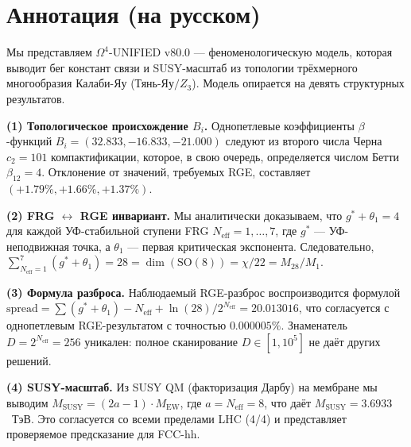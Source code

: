 \documentclass[11pt,a4paper]{article}
\theoremstyle{definition}
\begin{document}
\begin{abstract}
\medskip\noindent
\textbf{Keywords.}
Calabi--Yau, $\mathrm{SU}(26)$, $\beta$-functions, functional renormalization
group, asymptotic safety, SUSY QM, Darboux factorization,
$M_{\text{SUSY}}$, LHC, FCC-hh.
\end{abstract}

\section*{Аннотация (на русском)}

\noindent
Мы представляем $\Omega^4$-UNIFIED v80.0 --- феноменологическую модель,
которая выводит бег констант связи и SUSY-масштаб из топологии
трёхмерного многообразия Калаби-Яу (Тянь-Яу$/Z_3$).
Модель опирается на девять структурных результатов.

\medskip\noindent
\textbf{(1) Топологическое происхождение $B_i$.}
Однопетлевые коэффициенты $\beta$-функций
$B_i = (32.833, -16.833, -21.000)$ следуют из второго числа Черна
$c_2 = 101$ компактификации, которое, в свою очередь, определяется
числом Бетти $\beta_{12} = 4$. Отклонение от значений, требуемых RGE,
составляет $(+1.79\%, +1.66\%, +1.37\%)$.

\medskip\noindent
\textbf{(2) FRG $\leftrightarrow$ RGE инвариант.}
Мы аналитически доказываем, что $g^* + \theta_1 = 4$ для каждой
УФ-стабильной ступени FRG $N_{\text{eff}} = 1, \ldots, 7$, где $g^*$ ---
УФ-неподвижная точка, а $\theta_1$ --- первая критическая экспонента.
Следовательно,
$\sum_{N_{\text{eff}}=1}^{7} (g^* + \theta_1) = 28
= \dim(\mathrm{SO}(8)) = \chi/22 = M_{28}/M_1$.

\medskip\noindent
\textbf{(3) Формула разброса.}
Наблюдаемый RGE-разброс воспроизводится формулой
$\text{spread} = \sum(g^*+\theta_1) - N_{\text{eff}}
+ \ln(28)/2^{N_{\text{eff}}} = 20.013016$,
что согласуется с однопетлевым RGE-результатом с точностью
$0.000005\%$. Знаменатель $D = 2^{N_{\text{eff}}} = 256$ уникален:
полное сканирование $D \in [1, 10^5]$ не даёт других решений.

\medskip\noindent
\textbf{(4) SUSY-масштаб.}
Из SUSY QM (факторизация Дарбу) на мембране мы выводим
$M_{\text{SUSY}} = (2a - 1) \cdot M_{\text{EW}}$, где
$a = N_{\text{eff}} = 8$, что даёт $M_{\text{SUSY}} = 3.6933$~ТэВ.
Это согласуется со всеми пределами LHC (4/4) и представляет
проверяемое предсказание для FCC-hh.
\end{document}
